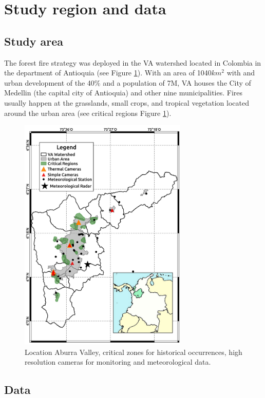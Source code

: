 \section{Study region and data}
 
\subsection{Study area}

The forest fire strategy was deployed in the VA watershed located in Colombia in the department of Antioquia (see Figure \ref{fig:ubicacion}). With an area of 1040$km^2$ with and urban development of the 40$\%$ and a population of 7M, VA houses the City of Medellin (the capital city of Antioquia) and other nine municipalities. Fires usually happen at the grasslands, small crops, and tropical vegetation located around the urban area (see critical regions Figure \ref{fig:ubicacion}).\\

\begin{figure}[h]
\centering
\includegraphics[trim={0.2cm 0cm 0.2cm 0cm},clip,width=8.0cm]{Figuras/map_intro_cameras.pdf}
\caption{Location Aburra Valley, critical zones for historical occurrences, high resolution cameras for monitoring and meteorological data.}
\label{fig:ubicacion}
\end{figure}

\subsection{Data}

